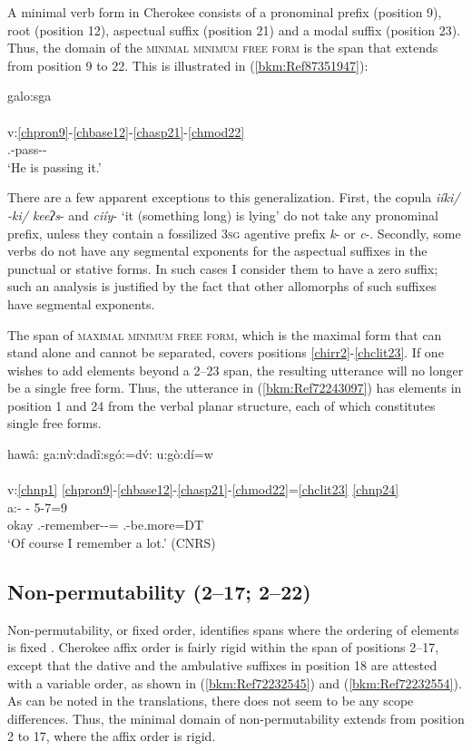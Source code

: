 \documentclass[output=paper]{langscibook}
\begin{document}
A minimal verb form in Cherokee consists of a pronominal prefix (position 9), root (position 12), aspectual suffix (position 21) and a modal suffix (position 23). Thus, the domain of the \textsc{minimal} \textsc{minimum} \textsc{free} \textsc{form} is the span that extends from position 9 to 22. This is illustrated in (\ref{bkm:Ref87351947}):

\ea\label{bkm:Ref87351947}galo:sga\\
\\
v:\ref{chpron9}-\ref{chbase12}-\ref{chasp21}-\ref{chmod22}\\
\Third\Sg.\Aarg{}-pass-\Prs{}-\Ind{}\\
\glt `He is passing it.' \citep[102]{Feeling1975}
\z 

There are a few apparent exceptions to this generalization. First, the copula \textit{iíki/ -ki/ keeʔs}{}- and \textit{ciíy}{}- `it (something long) is lying' do not take any pronominal prefix, unless they contain a fossilized 3\textsc{sg} agentive prefix \textit{k}{}- or \textit{c}{}-. Secondly, some verbs do not have any segmental exponents for the aspectual suffixes in the punctual or stative forms. In such cases I consider them to have a zero suffix; such an analysis is justified by the fact that other allomorphs of such suffixes have segmental exponents.

The span of \textsc{maximal} \textsc{minimum} \textsc{free} \textsc{form}, which is the maximal form that can stand alone and cannot be separated, covers positions \ref{chirr2}-\ref{chclit23}. If one wishes to add elements beyond a 2--23 span, the resulting utterance will no longer be a single free form. Thus, the utterance in (\ref{bkm:Ref72243097}) has elements in position 1 and 24 from the verbal planar structure, each of which constitutes single free forms.

\ea\label{bkm:Ref72243097}hawâ: ga:n\`{v}:dadî:sgó:=d\'{v}: u:gò:dí=w \\
\\
v:\ref{chnp1} \ref{chpron9}-\ref{chbase12}-\ref{chasp21}-\ref{chmod22}=\ref{chclit23} \ref{chnp24}\\
a:- - 5-7=9\\ 
okay \First\Sg.\Aarg{}-remember-\Impf{}-\Hab{}=\Emph{} \Third\Sg.\Barg{}-be.more=DT\\
\glt `Of course I remember a lot.' (CNRS)
\z 

\subsection{Non-permutability (2--17; 2--22)}
\label{bkm:Ref72229055}
Non-permutability, or fixed order, identifies spans where the ordering of elements is fixed \citep[23]{Tallman2020}. Cherokee affix order is fairly rigid within the span of positions 2--17, except that the dative and the ambulative suffixes in position 18 are attested with a variable order, as shown in (\ref{bkm:Ref72232545}) and (\ref{bkm:Ref72232554}). As can be noted in the translations, there does not seem to be any scope differences. Thus, the minimal domain of non-permutability extends from position 2 to 17, where the affix order is rigid. 
\end{document}
